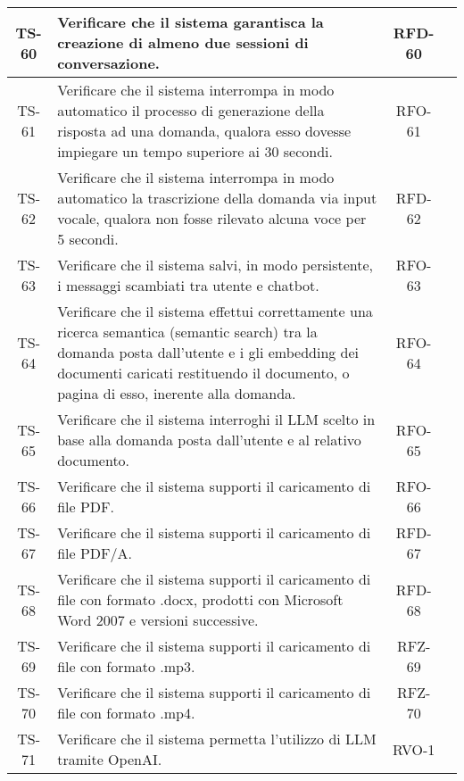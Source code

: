 \begin{xltabular}{\textwidth}{| c | X | c | c |}
    \hline
    TS-60 & Verificare che il sistema garantisca la creazione di almeno due sessioni di conversazione. & RFD-60 & \textcolor{cmarkcolor}{} \\
    \hline
    TS-61 & Verificare che il sistema interrompa in modo automatico il processo di generazione della risposta ad una domanda, qualora esso dovesse impiegare un tempo superiore ai 30 secondi. & RFO-61 & \textcolor{cmarkcolor}{}\\
    \hline
    TS-62 & Verificare che il sistema interrompa in modo automatico la trascrizione della domanda via input vocale, qualora non fosse rilevato alcuna voce per 5 secondi. & RFD-62 & \textcolor{xmarkcolor}{} \\
    \hline
    TS-63 & Verificare che il sistema salvi, in modo persistente, i messaggi scambiati tra utente e chatbot. & RFO-63 & \textcolor{cmarkcolor}{}\\
    \hline
    TS-64 & Verificare che il sistema effettui correttamente una ricerca semantica (semantic search) tra la domanda posta dall'utente e i gli embedding dei documenti caricati restituendo il documento, o pagina di esso, inerente alla domanda. & RFO-64 & \textcolor{cmarkcolor}{} \\
    \hline
    TS-65 & Verificare che il sistema interroghi il LLM scelto in base alla domanda posta dall'utente e al relativo documento. & RFO-65 & \textcolor{cmarkcolor}{} \\
    \hline
    TS-66 & Verificare che il sistema supporti il caricamento di file PDF. & RFO-66 & \textcolor{cmarkcolor}{} \\
    \hline
    TS-67 & Verificare che il sistema supporti il caricamento di file PDF/A. & RFD-67 & \textcolor{cmarkcolor}{} \\
    \hline
    TS-68 & Verificare che il sistema supporti il caricamento di file con formato .docx, prodotti con Microsoft Word 2007 e versioni successive. & RFD-68 & \textcolor{cmarkcolor}{} \\
    \hline
    TS-69 & Verificare che il sistema supporti il caricamento di file con formato .mp3. & RFZ-69 & \textcolor{cmarkcolor}{} \\
    \hline
    TS-70 & Verificare che il sistema supporti il caricamento di file con formato .mp4. & RFZ-70 & \textcolor{xmarkcolor}{} \\
    \hline
    TS-71 & Verificare che il sistema permetta l'utilizzo di LLM tramite OpenAI. & RVO-1 & \textcolor{cmarkcolor}{}\\

\end{xltabular}
